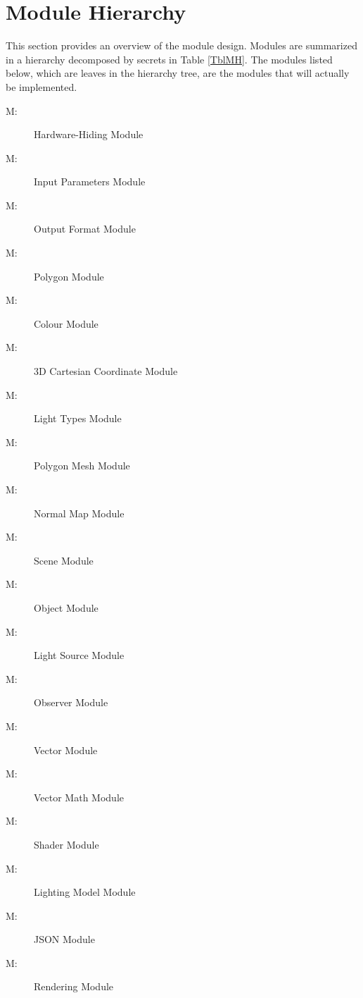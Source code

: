 \documentclass[12pt, titlepage]{article}
\newcounter{mnum}
\newcommand{\mthemnum}{M\themnum}
\begin{document}
\section{Module Hierarchy} \label{SecMH}

This section provides an overview of the module design. Modules are summarized
in a hierarchy decomposed by secrets in Table \ref{TblMH}. The modules listed
below, which are leaves in the hierarchy tree, are the modules that will
actually be implemented.

\begin{description}
\item [ \mthemnum \label{mHH}:] Hardware-Hiding Module
\item [ \mthemnum \label{mInputs}:] Input Parameters Module
\item [ \mthemnum \label{mOutputs}:] Output Format Module
\item [ \mthemnum \label{mPolygon}:] Polygon Module
\item [ \mthemnum \label{mColour}:] Colour Module
\item [ \mthemnum \label{mPoints}:] 3D Cartesian 
Coordinate 
Module
\item [ \mthemnum \label{mTypes}:] Light Types 
Module
\item [ \mthemnum \label{mMesh}:] Polygon Mesh Module
\item [ \mthemnum \label{mNormals}:] Normal Map Module
\item [ \mthemnum \label{mScene}:] Scene Module
\item [ \mthemnum \label{mObjects}:] Object Module
\item [ \mthemnum \label{mLights}:] Light Source Module
\item [ \mthemnum \label{mObsv}:] Observer Module
\item [ \mthemnum \label{mVectors}:] Vector Module
\item [ \mthemnum \label{mVecMath}:] Vector Math Module
\item [ \mthemnum \label{mShader}:] Shader Module
\item [ \mthemnum \label{mLightModel}:] Lighting Model 
Module
\item [ \mthemnum \label{mJSON}:] JSON Module
\item [ \mthemnum \label{mUnity}:] Rendering Module
\end{description}
\end{document}
